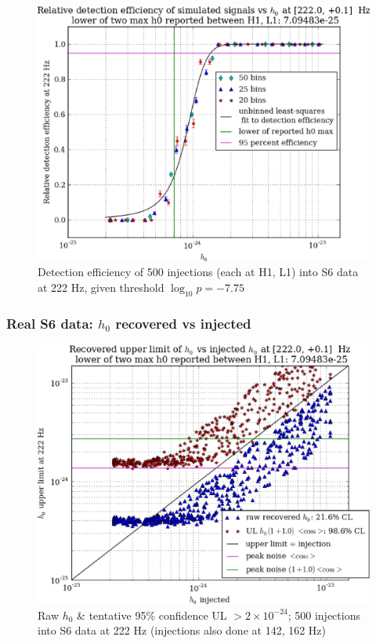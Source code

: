 \begin{figure}
\begin{center}
\includegraphics[width=0.5\paperwidth,height=0.35\paperheight]{plots/detectionEfficiencyh0-222-0Hz.eps}
\caption{
Detection efficiency of 500 injections (each at H1, L1) into
S6 data at 222 Hz, given threshold $\log_{10}p = -7.75$}
\end{center}
\end{figure}

\subsubsection{Real S6 data: $h_0$ recovered vs injected}

\begin{figure}
\begin{center}
\includegraphics[width=0.5\paperwidth,height=0.35\paperheight]{plots/h0UL-vs-h0injected-222-0Hz.eps}
\caption{
Raw $h_0$ \& tentative 95\% confidence UL $>2\times10^{-24}$; 500 injections
into S6 data at 222 Hz (injections also done at 142, 162 Hz)}
\end{center}
\end{figure}

